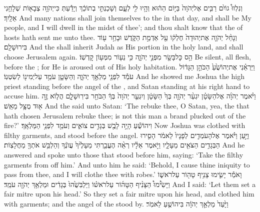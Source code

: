 \documentclass[11pt, openany]{book}
\begin{document}
{וְנִלְווּ֩ גוֹיִ֨ם רַבִּ֤ים אֶל\maqqaf יְהֹוָה֙ בַּיּ֣וֹם הַה֔וּא וְהָ֥יוּ לִ֖י לְעָ֑ם וְשָׁכַנְתִּ֣י בְתוֹכֵ֔ךְ וְיָדַ֕עַתְּ כִּי\maqqaf יְהֹוָ֥ה צְבָא֖וֹת שְׁלָחַ֥נִי אֵלָֽיִךְ׃}
{And many nations shall join themselves to the \lord\space in that day, and shall be My people, and I will dwell in the midst of thee’; and thou shalt know that the \lord\space of hosts hath sent me unto thee.}
{וְנָחַ֨ל יְהֹוָ֤ה אֶת\maqqaf יְהוּדָה֙ חֶלְק֔וֹ עַ֖ל אַדְמַ֣ת הַקֹּ֑דֶשׁ וּבָחַ֥ר ע֖וֹד בִּירוּשָׁלָֽ͏ִם׃}
{And the \lord\space shall inherit Judah as His portion in the holy land, and shall choose Jerusalem again.}
{הַ֥ס כׇּל\maqqaf בָּשָׂ֖ר מִפְּנֵ֣י יְהֹוָ֑ה כִּ֥י נֵע֖וֹר מִמְּע֥וֹן קׇדְשֽׁוֹ׃ \petucha }
{Be silent, all flesh, before the \lord; for He is aroused out of His holy habitation.}
\newperek
{}
{וַיַּרְאֵ֗נִי אֶת\maqqaf יְהוֹשֻׁ֙עַ֙ הַכֹּהֵ֣ן הַגָּד֔וֹל עֹמֵ֕ד לִפְנֵ֖י מַלְאַ֣ךְ יְהֹוָ֑ה וְהַשָּׂטָ֛ן עֹמֵ֥ד עַל\maqqaf יְמִינ֖וֹ לְשִׂטְנֽוֹ׃}
{And he showed me Joshua the high priest standing before the angel of the \lord, and Satan standing at his right hand to accuse him.}
{וַיֹּ֨אמֶר יְהֹוָ֜ה אֶל\maqqaf הַשָּׂטָ֗ן יִגְעַ֨ר יְהֹוָ֤ה בְּךָ֙ הַשָּׂטָ֔ן וְיִגְעַ֤ר יְהֹוָה֙ בְּךָ֔ הַבֹּחֵ֖ר בִּירֽוּשָׁלָ֑͏ִם הֲל֧וֹא זֶ֦ה א֖וּד מֻצָּ֥ל מֵאֵֽשׁ׃}
{And the \lord\space said unto Satan: ‘The \lord\space rebuke thee, O Satan, yea, the \lord\space that hath chosen Jerusalem rebuke thee; is not this man a brand plucked out of the fire?’}
{וִיהוֹשֻׁ֕עַ הָיָ֥ה לָבֻ֖שׁ בְּגָדִ֣ים צוֹאִ֑ים וְעֹמֵ֖ד לִפְנֵ֥י הַמַּלְאָֽךְ׃}
{Now Joshua was clothed with filthy garments, and stood before the angel.}
{וַיַּ֣עַן וַיֹּ֗אמֶר אֶל\maqqaf הָעֹמְדִ֤ים לְפָנָיו֙ לֵאמֹ֔ר הָסִ֛ירוּ הַבְּגָדִ֥ים הַצֹּאִ֖ים מֵעָלָ֑יו וַיֹּ֣אמֶר אֵלָ֗יו רְאֵ֨ה הֶעֱבַ֤רְתִּי מֵעָלֶ֙יךָ֙ עֲוֺנֶ֔ךָ וְהַלְבֵּ֥שׁ אֹתְךָ֖ מַחֲלָצֽוֹת׃}
{And he answered and spoke unto those that stood before him, saying: ‘Take the filthy garments from off him.’ And unto him he said: ‘Behold, I cause thine iniquity to pass from thee, and I will clothe thee with robes.’}
{וָאֹמַ֕ר יָשִׂ֛ימוּ צָנִ֥יף טָה֖וֹר עַל\maqqaf רֹאשׁ֑וֹ וַיָּשִׂ֩ימוּ֩ הַצָּנִ֨יף הַטָּה֜וֹר עַל\maqqaf רֹאשׁ֗וֹ וַיַּלְבִּשֻׁ֙הוּ֙ בְּגָדִ֔ים וּמַלְאַ֥ךְ יְהֹוָ֖ה עֹמֵֽד׃}
{And I said: ‘Let them set a fair mitre upon his head.’ So they set a fair mitre upon his head, and clothed him with garments; and the angel of the \lord\space stood by.}
{וַיָּ֙עַד֙ מַלְאַ֣ךְ יְהֹוָ֔ה בִּיהוֹשֻׁ֖עַ לֵאמֹֽר׃}
\end{document}
